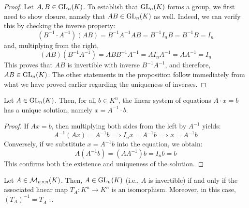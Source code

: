 \begin{proof}
Let $A, B \in \operatorname{GL}_n(K)$. To establish that $\operatorname{GL}_n(K)$ forms a group, we first need to show closure, namely that $AB \in \operatorname{GL}_n(K)$ as well. Indeed, we can verify this by checking the inverse property:
\begin{equation*}
    (B^{-1} \cdot A^{-1})(AB) = B^{-1}A^{-1}AB = B^{-1}I_nB = B^{-1}B = I_n
\end{equation*}
and, multiplying from the right,
\begin{equation*}
    (AB)(B^{-1}A^{-1}) = ABB^{-1}A^{-1} = AI_nA^{-1} = AA^{-1} = I_n
\end{equation*}
This proves that $AB$ is invertible with inverse $B^{-1}A^{-1}$, and therefore, $AB \in \operatorname{GL}_n(K)$. The other statements in the proposition follow immediately from what we have proved earlier regarding the uniqueness of inverses.
\end{proof}

\begin{corollary}
\label{cor:unique_solution_via_inverse}
Let $A \in \operatorname{GL}_n(K)$. Then, for all $b \in K^n$, the linear system of equations $A \cdot x = b$ has a unique solution, namely $x = A^{-1} \cdot b$.
\end{corollary}

\begin{proof}
If $Ax = b$, then multiplying both sides from the left by $A^{-1}$ yields:
\begin{equation*}
    A^{-1}(Ax) = A^{-1}b \implies I_n x = A^{-1}b \implies x = A^{-1}b
\end{equation*}
Conversely, if we substitute $x = A^{-1}b$ into the equation, we obtain:
\begin{equation*}
    A(A^{-1}b) = (AA^{-1})b = I_n b = b
\end{equation*}
This confirms both the existence and uniqueness of the solution.
\end{proof}

\begin{proposition}
\label{prop:invertibility_isomorphism_equivalence}
Let $A \in \mathcal{M}_{n \times n}(K)$. Then, $A \in \operatorname{GL}_n(K)$ (i.e., $A$ is invertible) if and only if the associated linear map $T_A: K^n \to K^n$ is an isomorphism. Moreover, in this case, $(T_A)^{-1} = T_{A^{-1}}$.
\end{proposition}

